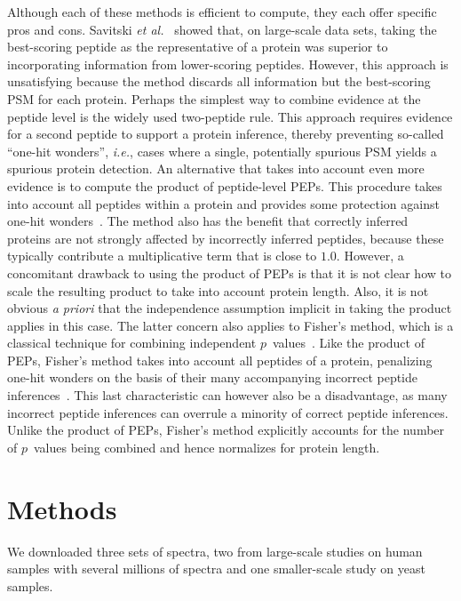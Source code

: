 \documentclass{article}
\begin{document}
Although each of these methods is efficient to compute, they each 
offer specific pros and cons. Savitski {\em et 
al.}~\cite{savitski2015scalable} showed that, on large-scale data 
sets, taking the best-scoring peptide as the representative of a 
protein was superior to incorporating information from lower-scoring 
peptides. However, this approach is unsatisfying because the method 
discards all information but the best-scoring PSM for each protein. 
Perhaps the simplest way to combine evidence at the peptide level is 
the widely used two-peptide rule.  This approach requires evidence for
a second peptide to support a protein inference, thereby preventing
so-called ``one-hit wonders'', {\em i.e.}, cases where a single,
potentially spurious PSM yields a spurious protein detection. An
alternative that takes into account even more evidence is to compute
the product of peptide-level PEPs. This procedure takes into account
all peptides within a protein and provides some protection against
one-hit wonders~\cite{cox2008maxquant}. The method also has the
benefit that correctly inferred proteins are not strongly affected by
incorrectly inferred peptides, because these typically contribute a
multiplicative term that is close to $1.0$. However, a concomitant
drawback to using the product of PEPs is that it is not clear how to
scale the resulting product to take into account protein length.
Also, it is not obvious {\em a priori} that the independence
assumption implicit in taking the product applies in this case.  The
latter concern also applies to Fisher's method, which is a classical
technique for combining independent
$p$~values~\cite{fisher1925statistical}. Like the product of PEPs,
Fisher's method takes into account all peptides of a protein,
penalizing one-hit wonders on the basis of their many accompanying
incorrect peptide inferences~\cite{spirin2011assigning, alves2015mass,
  granholm2013determining}.  This last characteristic can however also
be a disadvantage, as many incorrect peptide inferences can overrule a
minority of correct peptide inferences.  Unlike the product of PEPs,
Fisher's method explicitly accounts for the number of $p$~values being
combined and hence normalizes for protein length.

\section*{Methods}

We downloaded three sets of spectra, two from large-scale studies on
human samples with several millions of spectra and one smaller-scale
study on yeast samples.
\end{document}
